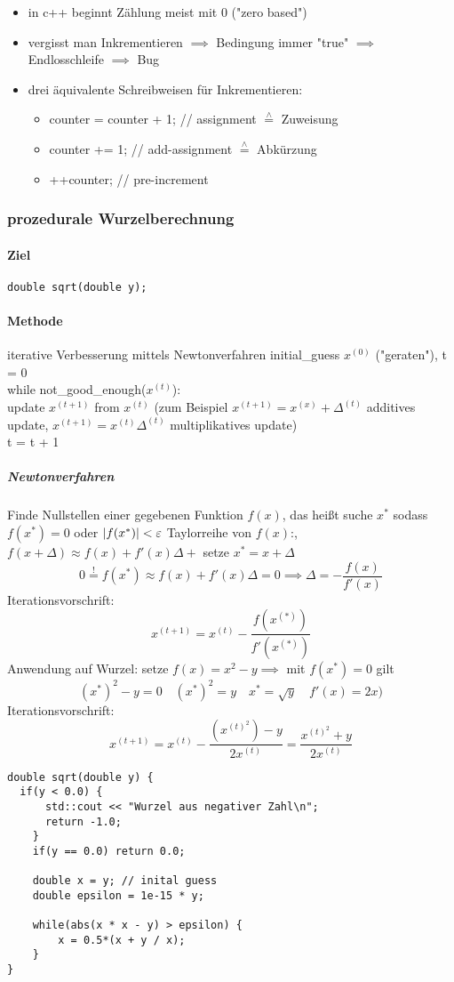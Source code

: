 \documentclass[a4paper]{scrartcl}
\newcommand{\estimates}{\overset{\scriptscriptstyle\wedge}{=}}%
\DeclarePairedDelimiter\abs{\lvert}{\rvert}%
\theoremstyle{definition}
\theoremstyle{plain}
\theoremstyle{remark}
\theoremstyle{remark}
\begin{document}
\begin{itemize}
\item in c++ beginnt Zählung meist mit $0$ ("zero based")
\item vergisst man Inkrementieren $\implies$ Bedingung immer "true" $\implies$ Endlosschleife $\implies$ Bug
\item drei äquivalente Schreibweisen für Inkrementieren:
\begin{itemize}
\item counter = counter + 1; // assignment $\estimates$ Zuweisung
\item counter += 1;          // add-assignment $\estimates$ Abkürzung
\item ++counter;             // pre-increment
\end{itemize}
\end{itemize}
\subsubsection{prozedurale Wurzelberechnung}
\label{sec-7-2-5}
\paragraph{Ziel}
\label{sec-7-2-5-1}
\begin{verbatim}
double sqrt(double y);
\end{verbatim}
\paragraph{Methode}
\label{sec-7-2-5-2}
iterative Verbesserung mittels Newtonverfahren
initial\_guess $x^{(0)}$ ("geraten"), t = 0 \\
     while not\_good\_enough($x^{(t)}$): \\
         update $x^{(t + 1)}$ from $x^{(t)}$ (zum Beispiel $x^{(t + 1)} = x^{(x)} + \Delta^{(t)}$ additives update, $x^{(t + 1)} = x^{(t)}\Delta^{(t)}$ multiplikatives update) \\
         t = t + 1 \\
\subparagraph{Newtonverfahren}
\label{sec-7-2-5-2-1}
Finde Nullstellen einer gegebenen Funktion $f(x)$, das heißt suche $x^\ast$ sodass $f(x^\ast) = 0$ oder $\abs{f(x^\ast)} < \varepsilon$
Taylorreihe von $f(x)$:, $f(x + \Delta) \approx f(x) + f'(x)\Delta +$ setze $x^\ast = x + \Delta$
\[0 \overset{!}{=} f(x^\ast) \approx f(x) + f'(x)\Delta = 0 \implies \Delta = - \frac{f(x)}{f'(x)}\]
Iterationsvorschrift:
\[x^{(t + 1)} = x^{(t)} - \frac{f(x^{(\ast)})}{f'(x^{(\ast)})}\]
Anwendung auf Wurzel: setze $f(x) = x^2 - y \implies$ mit $f(x^\ast) = 0$ gilt
\[(x^\ast)^2 -y = 0 \quad (x^\ast)^2 = y \quad x^\ast = \sqrt{y}\quad f'(x) = 2x)\]
Iterationsvorschrift:
\[x^{(t + 1)} = x^{(t)} - \frac{(x^{(t)^2}) - y}{2x^{(t)}} = \frac{x^{(t)^2} + y}{2x^{(t)}}\]
\begin{verbatim}
double sqrt(double y) {
  if(y < 0.0) {
	  std::cout << "Wurzel aus negativer Zahl\n";
	  return -1.0;
	}
	if(y == 0.0) return 0.0;

	double x = y; // inital guess
	double epsilon = 1e-15 * y;

	while(abs(x * x - y) > epsilon) {
		x = 0.5*(x + y / x);
	}
}
\end{verbatim}
\end{document}
